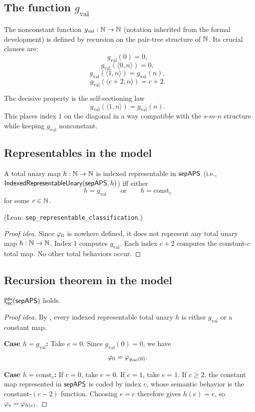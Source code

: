 \documentclass[11pt]{article}
\begin{document}
\subsection{The function \(g_{\mathrm{val}}\)}

The nonconstant function \(g_{\mathrm{val}}:\mathbb{N}\to\mathbb{N}\) (notation inherited from the formal development) is defined by recursion on the pair-tree structure of \(\mathbb{N}\).  Its crucial clauses are:
\[
g_{\mathrm{val}}(0)=0,
\]
\[
g_{\mathrm{val}}(\langle 0,n\rangle)=0,
\]
\[
g_{\mathrm{val}}(\langle 1,n\rangle)=g_{\mathrm{val}}(n),
\]
\[
g_{\mathrm{val}}(\langle c+2,n\rangle)=c+2.
\]

The decisive property is the self-sectioning law
\[
g_{\mathrm{val}}(\langle 1,n\rangle)=g_{\mathrm{val}}(n).
\]
This places index \(1\) on the diagonal in a way compatible with the \(s\)-\(m\)-\(n\) structure while keeping \(g_{\mathrm{val}}\) nonconstant.

\subsection{Representables in the model}

\begin{lemma}\label{lem:representables}
A total unary map \(h:\mathbb{N}\to\mathbb{N}\) is indexed representable in \(\mathsf{sepAPS}\) (i.e., \(\mathsf{IndexedRepresentableUnary}(\mathsf{sepAPS},h)\)) iff either
\[
h=g_{\mathrm{val}}
\qquad\text{or}\qquad
h=\mathrm{const}_c
\]
for some \(c\in\mathbb{N}\).
\end{lemma}
(Lean: \texttt{sep\_representable\_classification}.)

\begin{proof}[Proof idea]
Since \(\varphi_0\) is nowhere defined, it does not represent any total unary map \(h:\mathbb{N}\to\mathbb{N}\).  Index \(1\) computes \(g_{\mathrm{val}}\).  Each index \(c+2\) computes the constant-\(c\) total map.  No other total behaviors occur.
\end{proof}

\subsection{Recursion theorem in the model}

\begin{lemma}\label{lem:fixedpoints}
\(\mathsf{I}_{\mathsf{rec}}^{\mathsf{idx}}(\mathsf{sepAPS})\) holds.
\end{lemma}

\begin{proof}[Proof idea]
By , every indexed representable total unary \(h\) is either \(g_{\mathrm{val}}\) or a constant map.

\textbf{Case \(h=g_{\mathrm{val}}\):} Take \(e=0\).  Since \(g_{\mathrm{val}}(0)=0\), we have
\[
\varphi_0=\varphi_{g_{\mathrm{val}}(0)}.
\]

\textbf{Case \(h=\mathrm{const}_c\):} If \(c=0\), take \(e=0\).  If \(c=1\), take \(e=1\).  If \(c\ge 2\), the constant map represented in \(\mathsf{sepAPS}\) is coded by index \(c\), whose semantic behavior is the constant-\((c-2)\) function.  Choosing \(e=c\) therefore gives \(h(e)=e\), so \(\varphi_e=\varphi_{h(e)}\).
\end{proof}
\end{document}
